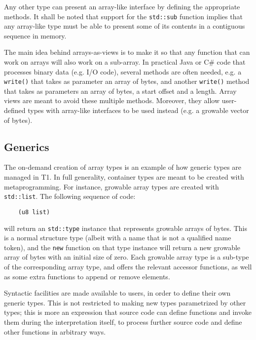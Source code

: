 Any other type can present an array-like interface by defining the
appropriate methods. It shall be noted that support for the
\verb|std::sub| function implies that any array-like type must
be able to present some of its contents in a contiguous sequence in
memory.

\begin{rationale}
The main idea behind arrays-as-views is to make it so that any function
that can work on arrays will also work on a sub-array. In practical Java
or C\# code that processes binary data (e.g. I/O code), several methods
are often needed, e.g. a \verb|write()| that takes as parameter an array
of bytes, and another \verb|write()| method that takes as parameters an
array of bytes, a start offset and a length. Array views are meant to
avoid these multiple methods. Moreover, they allow user-defined types
with array-like interfaces to be used instead (e.g. a growable vector of
bytes).
\end{rationale}

\subsection{Generics}

The on-demand creation of array types is an example of how generic types
are managed in T1. In full generality, container types are meant to be
created with metaprogramming. For instance, growable array types are
created with \verb|std::list|. The following sequence of code:
\begin{verbatim}
    (u8 list)
\end{verbatim}
will return an \verb|std::type| instance that represents growable arrays
of bytes. This is a normal structure type (albeit with a name that is
not a qualified name token), and the \verb|new| function on that type
instance will return a new growable array of bytes with an initial size
of zero. Each growable array type is a sub-type of the corresponding
array type, and offers the relevant accessor functions, as well as some
extra functions to append or remove elements.

Syntactic facilities are made available to users, in order to define
their own generic types. This is not restricted to making new types
parametrized by other types; this is more an expression that source code
can define functions and invoke them during the interpretation itself,
to process further source code and define other functions in arbitrary
ways.

